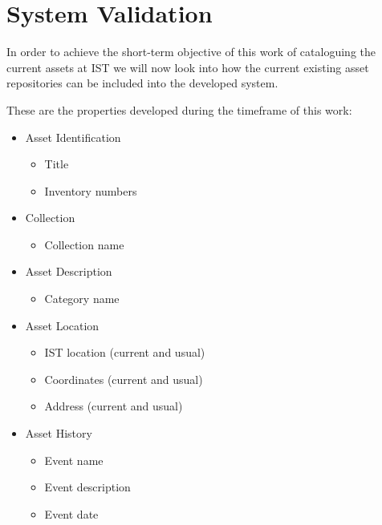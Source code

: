 
\section{System Validation}

In order to achieve the short-term objective of this work of cataloguing the current assets at IST we will now look into how the current existing asset repositories can be included into the developed system.

These are the properties developed during the timeframe of this work:

\begin{itemize}
    \item Asset Identification
    \begin{itemize}
        \item Title
        \item Inventory numbers
    \end{itemize}
    \item Collection
    \begin{itemize}
        \item Collection name
    \end{itemize}
    \item Asset Description
    \begin{itemize}
        \item Category name
    \end{itemize}
    \item Asset Location
    \begin{itemize}
        \item IST location (current and usual)
        \item Coordinates (current and usual)
        \item Address (current and usual)
    \end{itemize}
    \item Asset History
    \begin{itemize}
        \item Event name
        \item Event description
        \item Event date
    \end{itemize}
\end{itemize}

